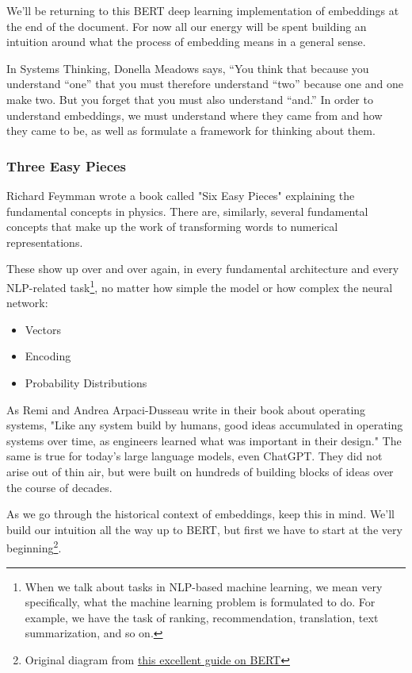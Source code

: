 \documentclass[draft, 11pt]{diazessay} %
\begin{document}
We'll be returning to this BERT deep learning implementation of embeddings at the end of the document. For now all our energy will be spent building an intuition around what the process of embedding means in a general sense. 

In Systems Thinking, Donella Meadows says, “You think that because you understand “one” that you must therefore understand “two” because one and one make two. But you forget that you must also understand “and.”\citep{meadows2008thinking} In order to understand embeddings, we must understand where they came from and how they came to be, as well as formulate a framework for thinking about them. 

\subsubsection{Three Easy Pieces}
Richard Feymman wrote a book called "Six Easy Pieces" explaining the fundamental concepts in physics. There are, similarly, several fundamental concepts that make up the work of transforming words to numerical representations. 

These show up over and over again, in every fundamental architecture and every NLP-related task\footnote{When we talk about tasks in NLP-based machine learning, we mean very specifically, what the machine learning problem is formulated to do. For example, we have the task of ranking, recommendation, translation, text summarization, and so on.}, no matter how simple the model or how complex the neural network: 

\begin{itemize}
  \item Vectors
  \item Encoding
  \item Probability Distributions
\end{itemize}

As Remi and Andrea Arpaci-Dusseau write in their book about operating systems, "Like any system build by humans, good ideas accumulated in operating systems over time, as engineers learned what was important in their design."\citep{arpaci2018operating} The same is true for today's large language models, even ChatGPT. They did not arise out of thin air, but were built on hundreds of building blocks of ideas over the course of decades.

As we go through the historical context of embeddings, keep this in mind. We'll build our intuition all the way up to BERT, but first we have to start at the very beginning\footnote{Original diagram from  \href{http://mccormickml.com/2019/11/11/bert-research-ep-1-key-concepts-and-sources/}{this excellent guide on BERT}}. 
\end{document}
